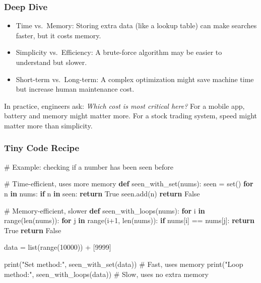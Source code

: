 \documentclass[
  letterpaper,
  DIV=11,
  numbers=noendperiod]{scrreprt}
\newenvironment{Shaded}{\begin{snugshade}}{\end{snugshade}}
\newcommand{\BuiltInTok}[1]{\textcolor[rgb]{0.00,0.23,0.31}{#1}}
\newcommand{\CommentTok}[1]{\textcolor[rgb]{0.37,0.37,0.37}{#1}}
\newcommand{\ControlFlowTok}[1]{\textcolor[rgb]{0.00,0.23,0.31}{\textbf{#1}}}
\newcommand{\DecValTok}[1]{\textcolor[rgb]{0.68,0.00,0.00}{#1}}
\newcommand{\KeywordTok}[1]{\textcolor[rgb]{0.00,0.23,0.31}{\textbf{#1}}}
\newcommand{\NormalTok}[1]{\textcolor[rgb]{0.00,0.23,0.31}{#1}}
\newcommand{\OperatorTok}[1]{\textcolor[rgb]{0.37,0.37,0.37}{#1}}
\newcommand{\StringTok}[1]{\textcolor[rgb]{0.13,0.47,0.30}{#1}}
\newcommand{\VariableTok}[1]{\textcolor[rgb]{0.07,0.07,0.07}{#1}}
\providecommand{\tightlist}{%
  \setlength{\itemsep}{0pt}\setlength{\parskip}{0pt}}
\begin{document}
\subsubsection{Deep Dive}\label{deep-dive-47}

\begin{itemize}
\tightlist
\item
  Time vs.~Memory: Storing extra data (like a lookup table) can make
  searches faster, but it costs memory.
\item
  Simplicity vs.~Efficiency: A brute-force algorithm may be easier to
  understand but slower.
\item
  Short-term vs.~Long-term: A complex optimization might save machine
  time but increase human maintenance cost.
\end{itemize}

In practice, engineers ask: \emph{Which cost is most critical here?} For
a mobile app, battery and memory might matter more. For a stock trading
system, speed might matter more than simplicity.

\subsubsection{Tiny Code Recipe}\label{tiny-code-recipe-75}

\begin{Shaded}
\begin{Highlighting}[]
\CommentTok{\# Example: checking if a number has been seen before}

\CommentTok{\# Time{-}efficient, uses more memory}
\KeywordTok{def}\NormalTok{ seen\_with\_set(nums):}
\NormalTok{    seen }\OperatorTok{=} \BuiltInTok{set}\NormalTok{()}
    \ControlFlowTok{for}\NormalTok{ n }\KeywordTok{in}\NormalTok{ nums:}
        \ControlFlowTok{if}\NormalTok{ n }\KeywordTok{in}\NormalTok{ seen:}
            \ControlFlowTok{return} \VariableTok{True}
\NormalTok{        seen.add(n)}
    \ControlFlowTok{return} \VariableTok{False}

\CommentTok{\# Memory{-}efficient, slower}
\KeywordTok{def}\NormalTok{ seen\_with\_loops(nums):}
    \ControlFlowTok{for}\NormalTok{ i }\KeywordTok{in} \BuiltInTok{range}\NormalTok{(}\BuiltInTok{len}\NormalTok{(nums)):}
        \ControlFlowTok{for}\NormalTok{ j }\KeywordTok{in} \BuiltInTok{range}\NormalTok{(i}\OperatorTok{+}\DecValTok{1}\NormalTok{, }\BuiltInTok{len}\NormalTok{(nums)):}
            \ControlFlowTok{if}\NormalTok{ nums[i] }\OperatorTok{==}\NormalTok{ nums[j]:}
                \ControlFlowTok{return} \VariableTok{True}
    \ControlFlowTok{return} \VariableTok{False}

\NormalTok{data }\OperatorTok{=} \BuiltInTok{list}\NormalTok{(}\BuiltInTok{range}\NormalTok{(}\DecValTok{10000}\NormalTok{)) }\OperatorTok{+}\NormalTok{ [}\DecValTok{9999}\NormalTok{]}

\BuiltInTok{print}\NormalTok{(}\StringTok{"Set method:"}\NormalTok{, seen\_with\_set(data))   }\CommentTok{\# Fast, uses memory}
\BuiltInTok{print}\NormalTok{(}\StringTok{"Loop method:"}\NormalTok{, seen\_with\_loops(data)) }\CommentTok{\# Slow, uses no extra memory}
\end{Highlighting}
\end{Shaded}
\end{document}
